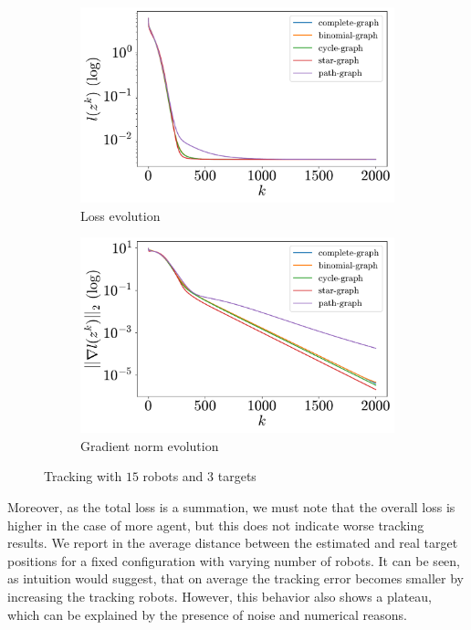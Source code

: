 \documentclass[a4paper,11pt,oneside]{book}
\begin{document}
\begin{figure}[htb!]
      \centering
      \begin{subfigure}[t]{0.46\linewidth}
            \centering
            \includegraphics[width=\linewidth]{./figs/tracking/15_3_2_2000/loss.pdf} 
            \caption{Loss evolution}
      \end{subfigure}
      \hfill
      \begin{subfigure}[t]{0.46\linewidth}
            \centering
            \includegraphics[width=\linewidth]{./figs/tracking/15_3_2_2000/gradient.pdf} 
            \caption{Gradient norm evolution}
      \end{subfigure}
      \caption{Tracking with $15$ robots and $3$ targets}
      \label{fig:tracking_15_3}
\end{figure}

Moreover, as the total loss is a summation, we must note that the overall loss is higher in the case of more agent, but this does not indicate worse tracking results. We report in  the average distance between the estimated and real target positions for a fixed configuration with varying number of robots. It can be seen, as intuition would suggest, that on average the tracking error becomes smaller by increasing the tracking robots. However, this behavior also shows a plateau, which can be explained by the presence of noise and numerical reasons.
\end{document}
